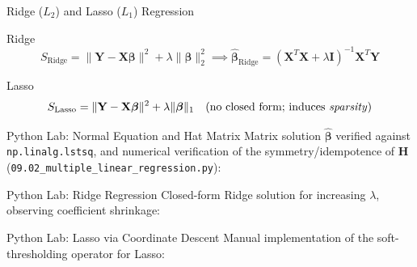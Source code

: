 \documentclass[10pt, aspectratio=169]{beamer}
\begin{document}
\begin{frame}{Ridge ($L_2$) and Lasso ($L_1$) Regression}
  \footnotesize
  \begin{block}{Ridge}
    $$S_{\text{Ridge}}=\|\mathbf{Y}-\mathbf{X}\boldsymbol\beta\|^2+\lambda\|\boldsymbol\beta\|_2^2 \implies \hat{\boldsymbol\beta}_{\text{Ridge}}=(\mathbf{X}^T\mathbf{X}+\lambda\mathbf{I})^{-1}\mathbf{X}^T\mathbf{Y}$$
  \end{block}
  \pause

  \vspace{0.1cm}
  \begin{alertblock}{Lasso}
    $$S_{\text{Lasso}}=\|\mathbf{Y}-\mathbf{X}\boldsymbol\beta\|^2+\lambda\|\boldsymbol\beta\|_1 \quad \text{(no closed form; induces \emph{sparsity})}$$
  \end{alertblock}
\end{frame}

\begin{frame}[fragile]{Python Lab: Normal Equation and Hat Matrix}
  \scriptsize
  Matrix solution $\hat{\boldsymbol\beta}$ verified against \texttt{np.linalg.lstsq}, and numerical verification of the symmetry/idempotence of $\mathbf{H}$ (\texttt{09.02\_multiple\_linear\_regression.py}):
  {
  }
\end{frame}

\begin{frame}[fragile]{Python Lab: Ridge Regression}
  \scriptsize
  Closed-form Ridge solution for increasing $\lambda$, observing coefficient shrinkage:
  {
  }
\end{frame}

\begin{frame}[fragile]{Python Lab: Lasso via Coordinate Descent}
  \scriptsize
  Manual implementation of the soft-thresholding operator for Lasso:
  {
  }
\end{frame}
\end{document}
